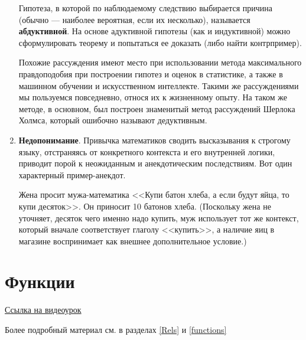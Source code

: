 \begin{enumerate}
Гипотеза, в которой по наблюдаемому следствию выбирается причина (обычно --- наиболее вероятная, если их несколько), называется \textbf{абдуктивной}. На основе адуктивной гипотезы (как и индуктивной) можно сформулировать теорему и попытаться ее доказать (либо найти контрпример).

Похожие рассуждения имеют место при использовании метода максимального правдоподобия при построении гипотез и оценок в статистике, а также в машинном обучении и искусственном интеллекте. Такими же рассуждениями мы пользуемся повседневно, относя их к жизненному опыту. На таком же методе, в основном, был построен знаменитый метод рассуждений Шерлока Холмса, который ошибочно называют дедуктивным.

\item \textbf{Недопонимание}. Привычка математиков сводить высказывания к строгому языку, отстраняясь от конкретного контекста и его внутренней логики, приводит порой к неожиданным и анекдотическим последствиям. Вот один характерный пример-анекдот.

Жена просит мужа-математика <<Купи батон хлеба, а если будут яйца, то купи десяток>>. Он приносит 10 батонов хлеба. (Поскольку жена не уточняет, десяток чего именно надо купить, муж использует тот же контекст, который вначале соответствует глаголу <<купить>>, а наличие яиц в магазине воспринимает как внешнее дополнительное условие.)
\end{enumerate}


\section{Функции}

\href{https://www.youtube.com/watch?v=KiOvT74eXw0}{Ссылка на видеоурок}

Более подробный материал см. в разделах \ref{Rels} и \ref{functions}

